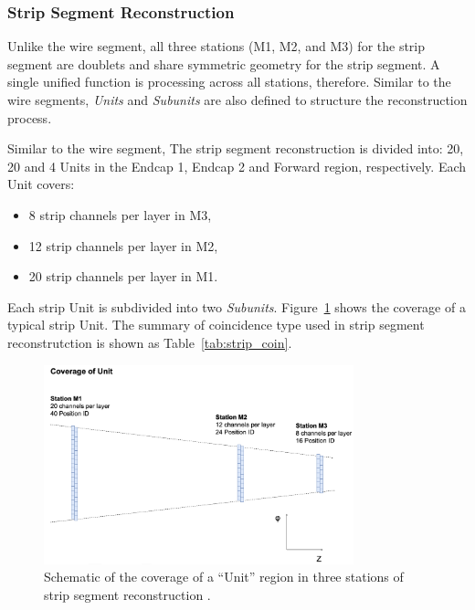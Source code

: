 \subsubsection{Strip Segment Reconstruction}

Unlike the wire segment, all three stations (M1, M2, and M3) for the strip segment are doublets and share symmetric geometry for the strip segment. A single unified function is processing across all stations, therefore. Similar to the wire segments, \textit{Units} and \textit{Subunits} are also defined to structure the reconstruction process.

Similar to the wire segment, The strip segment reconstruction is divided into: 20, 20 and 4 Units in the Endcap 1, Endcap 2 and Forward region, respectively. Each Unit covers:
\begin{itemize}
  \item 8 strip channels per layer in M3,
  \item 12 strip channels per layer in M2,
  \item 20 strip channels per layer in M1.
\end{itemize}
Each strip Unit is subdivided into two \textit{Subunits}. Figure~\ref{fig:strip_unit} shows the coverage of a typical strip Unit. The summary of coincidence type used in strip segment reconstrutction is shown as Table~\ref{tab:strip_coin}.


\begin{figure}[htbp]
  \centering
  \includegraphics[width=0.8\textwidth]{figs/chapter5/strip_unit.png}
  \caption{Schematic of the coverage of a ``Unit'' region in three stations of strip segment reconstruction \cite{EndcapSLPDR}.}
  \label{fig:strip_unit}
\end{figure}


